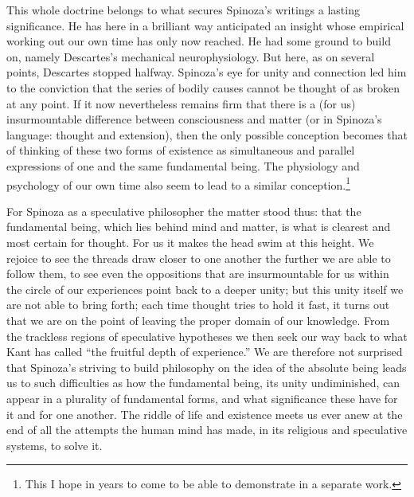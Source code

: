 \documentclass[12pt]{book}
\newcommand{\opage}[1]{\marginnote{\footnotesize\textit{[#1]}}}
\begin{document}
This whole doctrine belongs to what secures Spinoza's writings a lasting significance.
He has here in a brilliant way anticipated an insight whose empirical working out our
own time has only now reached. He had some ground to build on, namely Descartes's
mechanical neurophysiology. But here, as on several points, Descartes stopped halfway.
Spinoza's eye for unity and connection led him to the conviction that the series of
bodily causes cannot be thought of as broken at any point. If it now nevertheless
remains firm that there is a (for us) insurmountable difference between consciousness
and matter (or in Spinoza's language: thought and extension), then the only possible
conception becomes that of thinking of these two forms of existence as simultaneous and
parallel expressions of one and the same fundamental being. The physiology and
psychology of our own time also seem to lead to a similar conception.\footnote{This I
hope in years to come to be able to demonstrate in a separate work.}

For Spinoza as a speculative philosopher the matter stood thus: that the fundamental
being, which lies behind mind and matter, is what is clearest and most certain for
thought. For us it makes the head swim at this height. We rejoice to see the threads
draw closer to one another the further we are able to follow them, to see even the
oppositions that are insurmountable for us within the circle of our experiences point
back to a deeper unity; but this unity itself we are not able \opage{98}to bring forth;
each time thought tries to hold it fast, it turns out that we are on the point of
leaving the proper domain of our knowledge. From the trackless regions of speculative
hypotheses we then seek our way back to what Kant has called ``the fruitful depth of
experience.'' We are therefore not surprised that Spinoza's striving to build philosophy
on the idea of the absolute being leads us to such difficulties as how the fundamental
being, its unity undiminished, can appear in a plurality of fundamental forms, and what
significance these have for it and for one another. The riddle of life and existence
meets us ever anew at the end of all the attempts the human mind has made, in its
religious and speculative systems, to solve it.
\end{document}
